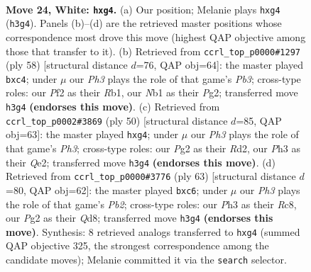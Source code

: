 \documentclass[11pt]{article}
\begin{document}
\clearpage

\begin{figure}[p]\centering
\begin{subfigure}{0.46\textwidth}\centering
\resizebox{\linewidth}{!}{%
\newchessgame
\chessboard[
  setfen={rnb1k1r1/8/4q3/p2p1p2/1p1B2pp/7P/PPPQ1PP1/RN4KR w q - 0 24},
  showmover=false,
  pgfstyle=straightmove, color=movearrow, markmove={h3-g4}
]}
\caption{}
\end{subfigure}\hfill
\begin{subfigure}{0.46\textwidth}\centering
\resizebox{\linewidth}{!}{%
\newchessgame
\chessboard[
  setfen={1r5k/4r2p/qb2p1p1/p2pP3/B1p2PQP/1PP5/6PK/1R3R2 w - - 1 30},
  showmover=false,
  pgfstyle=straightmove, color=movearrow, markmove={b3-c4}
]}
\caption{}
\end{subfigure}
\\[4pt]
\begin{subfigure}{0.46\textwidth}\centering
\resizebox{\linewidth}{!}{%
\newchessgame
\chessboard[
  setfen={r3r1k1/2p5/2p2bq1/2B1pb1p/pPP3p1/P6P/3RQPPN/4R1K1 w - - 0 26},
  showmover=false,
  pgfstyle=straightmove, color=movearrow, markmove={h3-g4}
]}
\caption{}
\end{subfigure}\hfill
\begin{subfigure}{0.46\textwidth}\centering
\resizebox{\linewidth}{!}{%
\newchessgame
\chessboard[
  setfen={2rqb1k1/1p4rp/2Pn1pp1/4p3/p3P1PP/P4PN1/1P4R1/1BR1Q1K1 b - - 0 32},
  showmover=false,
  pgfstyle=straightmove, color=movearrow, markmove={b7-c6}
]}
\caption{}
\end{subfigure}
\caption{\textbf{Move 24, White: \texttt{hxg4}.} (a) Our position; Melanie plays \texttt{hxg4} (\texttt{h3g4}). Panels (b)--(d) are the retrieved master positions whose correspondence most drove this move (highest QAP objective among those that transfer to it). (b) Retrieved from \texttt{ccrl\_top\_p0000\#1297} (ply 58) [structural distance $d$=76, QAP obj=64]: the master played \texttt{bxc4}; under $\mu$ our \emph{Ph3} plays the role of that game's \emph{Pb3}; cross-type roles: our \emph{P}f2 as their \emph{R}b1, our \emph{N}b1 as their \emph{P}g2; transferred move \texttt{h3g4} \textbf{(endorses this move)}. (c) Retrieved from \texttt{ccrl\_top\_p0002\#3869} (ply 50) [structural distance $d$=85, QAP obj=63]: the master played \texttt{hxg4}; under $\mu$ our \emph{Ph3} plays the role of that game's \emph{Ph3}; cross-type roles: our \emph{P}g2 as their \emph{R}d2, our \emph{P}h3 as their \emph{Q}e2; transferred move \texttt{h3g4} \textbf{(endorses this move)}. (d) Retrieved from \texttt{ccrl\_top\_p0000\#3776} (ply 63) [structural distance $d$=80, QAP obj=62]: the master played \texttt{bxc6}; under $\mu$ our \emph{Ph3} plays the role of that game's \emph{Pb2}; cross-type roles: our \emph{P}h3 as their \emph{R}c8, our \emph{P}g2 as their \emph{Q}d8; transferred move \texttt{h3g4} \textbf{(endorses this move)}. Synthesis: 8 retrieved analogs transferred to \texttt{hxg4} (summed QAP objective 325, the strongest correspondence among the candidate moves); Melanie committed it via the \texttt{search} selector.}
\label{fig:thought-m46}
\end{figure}
\end{document}
